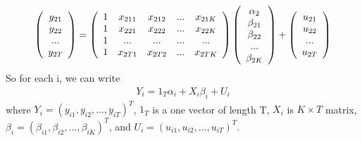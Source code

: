 \documentclass[a4paper]{article}
\begin{document}
\begin{align*}
 \left( \begin{array} { c  } 
                   y_{21}  \\
                   y_{22}  \\
                   ... \\
                   y_{2T} \\
           \end{array} \right)
       = \left( \begin{array} { c c c c c } 
                 1 &  x_{211} & x_{212} & ... & x_{21K} \\
                 1 &  x_{221} & x_{222} & ... & x_{22K}\\
                 1 &  ... & ... & ...&...\\
                 1 &  x_{2T1} & x_{2T2} & ... &x_{2TK}\\
           \end{array} \right)
            \left( \begin{array} { c } 
                   \alpha_2 \\
                   \beta_{21}  \\
                   \beta_{22}  \\
                   ... \\
                   \beta_{2K} \\
           \end{array} \right)
               +
            \left( \begin{array} { c  } 
                   u_{21}  \\
                   u_{22}  \\
                   ... \\
                   u_{2T} \\
           \end{array} \right)
\end{align*}
So for each i, we can write
\begin{align*}
Y_i = 1_T \alpha_i+ X_i \beta_i + U_i
\end{align*}
where $Y_i = (y_{i1}, y_{i2}, ...,y_{iT})^T$, $1_T$ is a one vector of length T, $X_i$ is $K \times T $ matrix, $\beta_i = (\beta_{i1}, \beta_{i2}, ...,\beta_{iK})^T$, and $U_i = (u_{i1}, u_{i2}, ...,u_{iT})^T$.
\end{document}
